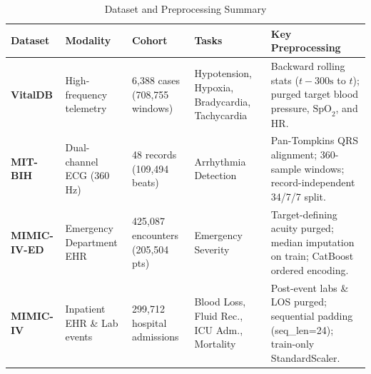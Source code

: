 \documentclass[conference]{IEEEtran}
\begin{document}
\begin{table}[t]
\centering
\caption{Dataset and Preprocessing Summary}
\label{tab:datasets}
\begin{tabularx}{\textwidth}{l l l l X}
\toprule
\textbf{Dataset} & \textbf{Modality} & \textbf{Cohort} & \textbf{Tasks} & \textbf{Key Preprocessing} \\
\midrule
\textbf{VitalDB} & High-frequency telemetry & 6,388 cases (708,755 windows) & Hypotension, Hypoxia, Bradycardia, Tachycardia & Backward rolling stats ($t-300\text{s}$ to $t$); purged target blood pressure, $\text{SpO}_2$, and HR. \\
\textbf{MIT-BIH} & Dual-channel ECG (360 Hz) & 48 records (109,494 beats) & Arrhythmia Detection & Pan-Tompkins QRS alignment; 360-sample windows; record-independent 34/7/7 split. \\
\textbf{MIMIC-IV-ED} & Emergency Department EHR & 425,087 encounters (205,504 pts) & Emergency Severity & Target-defining acuity purged; median imputation on train; CatBoost ordered encoding. \\
\textbf{MIMIC-IV} & Inpatient EHR \& Lab events & 299,712 hospital admissions & Blood Loss, Fluid Rec., ICU Adm., Mortality & Post-event labs \& LOS purged; sequential padding (seq\_len=24); train-only StandardScaler. \\
\bottomrule
\end{tabularx}
\end{table}
\end{document}
